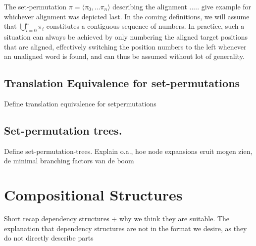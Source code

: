 \documentclass{report}
\theoremstyle{definition}
\theoremstyle{plain}
\begin{document}
The set-permutation $\pi=\langle \pi_0,\ldots\pi_n\rangle$ describing the alignment ..... give example for whichever alignment was depicted last. In the coming definitions, we will assume that $\bigcup_{i=0}^{n} \pi_i$ constitutes a contiguous sequence of numbers. In practice, such a situation can always be achieved by only numbering the aligned target positions that are aligned, effectively switching the position numbers to the left whenever an unaligned word is found, and can thus be assumed without lot of generality.

\subsection{Translation Equivalence for set-permutations}

Define translation equivalence for setpermutations



\subsection{Set-permutation trees.}

Define set-permutation-trees. Explain o.a., hoe node expansions eruit mogen zien, de minimal branching factors van de boom





\section{Compositional Structures}

Short recap dependency structures + why we think they are suitable. The explanation that dependency structures are not in the format we desire, as they do not directly describe parts
\end{document}
